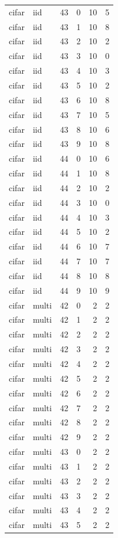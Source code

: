 \begin{tabular}{llrrrr}
cifar & iid & 43 & 0 & 10 & 5 \\
cifar & iid & 43 & 1 & 10 & 8 \\
cifar & iid & 43 & 2 & 10 & 2 \\
cifar & iid & 43 & 3 & 10 & 0 \\
cifar & iid & 43 & 4 & 10 & 3 \\
cifar & iid & 43 & 5 & 10 & 2 \\
cifar & iid & 43 & 6 & 10 & 8 \\
cifar & iid & 43 & 7 & 10 & 5 \\
cifar & iid & 43 & 8 & 10 & 6 \\
cifar & iid & 43 & 9 & 10 & 8 \\
cifar & iid & 44 & 0 & 10 & 6 \\
cifar & iid & 44 & 1 & 10 & 8 \\
cifar & iid & 44 & 2 & 10 & 2 \\
cifar & iid & 44 & 3 & 10 & 0 \\
cifar & iid & 44 & 4 & 10 & 3 \\
cifar & iid & 44 & 5 & 10 & 2 \\
cifar & iid & 44 & 6 & 10 & 7 \\
cifar & iid & 44 & 7 & 10 & 7 \\
cifar & iid & 44 & 8 & 10 & 8 \\
cifar & iid & 44 & 9 & 10 & 9 \\
cifar & multi & 42 & 0 & 2 & 2 \\
cifar & multi & 42 & 1 & 2 & 2 \\
cifar & multi & 42 & 2 & 2 & 2 \\
cifar & multi & 42 & 3 & 2 & 2 \\
cifar & multi & 42 & 4 & 2 & 2 \\
cifar & multi & 42 & 5 & 2 & 2 \\
cifar & multi & 42 & 6 & 2 & 2 \\
cifar & multi & 42 & 7 & 2 & 2 \\
cifar & multi & 42 & 8 & 2 & 2 \\
cifar & multi & 42 & 9 & 2 & 2 \\
cifar & multi & 43 & 0 & 2 & 2 \\
cifar & multi & 43 & 1 & 2 & 2 \\
cifar & multi & 43 & 2 & 2 & 2 \\
cifar & multi & 43 & 3 & 2 & 2 \\
cifar & multi & 43 & 4 & 2 & 2 \\
cifar & multi & 43 & 5 & 2 & 2 \\

\end{tabular}
